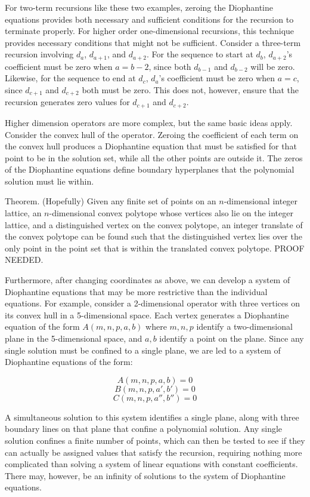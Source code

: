 \documentclass{article}
\begin{document}
For two-term recursions like these two examples, zeroing the
Diophantine equations provides both necessary and sufficient
conditions for the recursion to terminate properly.  For higher order
one-dimensional recursions, this technique provides necessary
conditions that might not be sufficient.  Consider a three-term
recursion involving $d_a$, $d_{a+1}$, and $d_{a+2}$.  For the sequence
to start at $d_b$, $d_{a+2}$'s coefficient must be zero when $a=b-2$,
since both $d_{b-1}$ and $d_{b-2}$ will be zero.  Likewise, for the
sequence to end at $d_c$, $d_a$'s coefficient must be zero when $a=c$,
since $d_{c+1}$ and $d_{c+2}$ both must be zero.  This does not,
however, ensure that the recursion generates zero values for $d_{c+1}$
and $d_{c+2}$.

Higher dimension operators are more complex, but the same basic ideas
apply.  Consider the convex hull of the operator.  Zeroing the
coefficient of each term on the convex hull produces a Diophantine
equation that must be satisfied for that point to be in the solution
set, while all the other points are outside it.  The zeros of the
Diophantine equations define boundary hyperplanes that the polynomial
solution must lie within.

Theorem.  (Hopefully) Given any finite set of points on an
$n$-dimensional integer lattice, an $n$-dimensional convex polytope
whose vertices also lie on the integer lattice, and a distinguished
vertex on the convex polytope, an integer translate of the convex
polytope can be found such that the distinguished vertex lies
over the only point in the point set that is within the translated
convex polytope.  PROOF NEEDED.

Furthermore, after changing coordinates as above, we can develop a
system of Diophantine equations that may be more restrictive than the
individual equations.  For example, consider a 2-dimensional operator
with three vertices on its convex hull in a 5-dimensional space.  Each
vertex generates a Diophantine equation of the form $A(m,n,p,a,b)$
where $m,n,p$ identify a two-dimensional plane in the 5-dimensional
space, and $a,b$ identify a point on the plane.  Since any single
solution must be confined to a single plane, we are led to a
system of Diophantine equations of the form:

$$A(m,n,p,a,b) = 0$$
$$B(m,n,p,a',b') = 0$$
$$C(m,n,p,a'',b'') = 0$$

A simultaneous solution to this system identifies a single plane,
along with three boundary lines on that plane that confine a
polynomial solution.  Any single solution confines a finite number of
points, which can then be tested to see if they can actually be
assigned values that satisfy the recursion, requiring nothing more
complicated than solving a system of linear equations with constant
coefficients.  There may, however, be an infinity of solutions to the
system of Diophantine equations.
\end{document}
